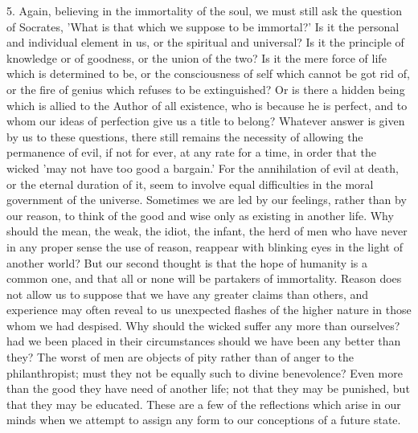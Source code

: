5. Again, believing in the immortality of the soul, we must still
ask the question of Socrates, 'What is that which we suppose to be
immortal?' Is it the personal and individual element in us, or the
spiritual and universal? Is it the principle of knowledge or of
goodness, or the union of the two? Is it the mere force of life which is
determined to be, or the consciousness of self which cannot be got rid
of, or the fire of genius which refuses to be extinguished? Or is there
a hidden being which is allied to the Author of all existence, who is
because he is perfect, and to whom our ideas of perfection give us a
title to belong? Whatever answer is given by us to these questions,
there still remains the necessity of allowing the permanence of evil, if
not for ever, at any rate for a time, in order that the wicked 'may not
have too good a bargain.' For the annihilation of evil at death, or the
eternal duration of it, seem to involve equal difficulties in the moral
government of the universe. Sometimes we are led by our feelings, rather
than by our reason, to think of the good and wise only as existing in
another life. Why should the mean, the weak, the idiot, the infant,
the herd of men who have never in any proper sense the use of reason,
reappear with blinking eyes in the light of another world? But our
second thought is that the hope of humanity is a common one, and that
all or none will be partakers of immortality. Reason does not allow us
to suppose that we have any greater claims than others, and experience
may often reveal to us unexpected flashes of the higher nature in
those whom we had despised. Why should the wicked suffer any more than
ourselves? had we been placed in their circumstances should we have been
any better than they? The worst of men are objects of pity rather than
of anger to the philanthropist; must they not be equally such to divine
benevolence? Even more than the good they have need of another life; not
that they may be punished, but that they may be educated. These are
a few of the reflections which arise in our minds when we attempt to
assign any form to our conceptions of a future state.

